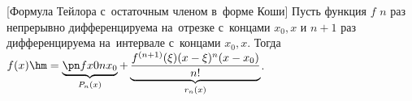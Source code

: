 [Формула Тейлора с~остаточным членом в~форме Коши]
    Пусть функция $f$ $n$ раз непрерывно дифференцируема на~отрезке с~концами $x_0,x$ и $n+1$ раз дифференцируема на~интервале с~концами
    $x_0,x$.
    Тогда $f(x)\hm=\underbrace{\pn fx0n{x_0}}_{P_n(x)}+\underbrace{\vphantom{\pn fx0n{x_0}}\dfrac{f^{(n+1)}(\xi)(x-\xi)^n(x-x_0)}{n!}}_{r_n(x)}$.
